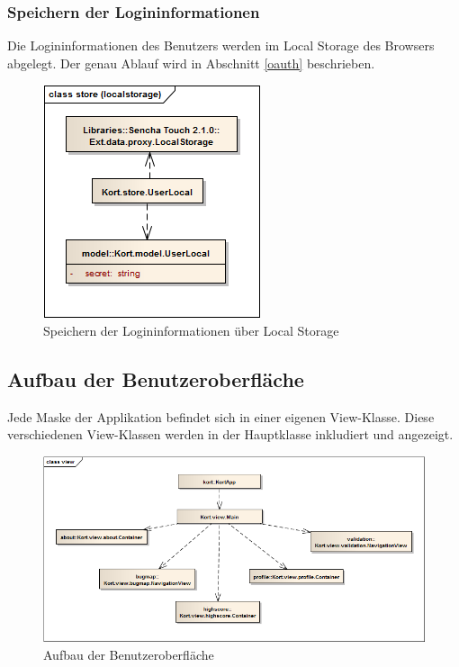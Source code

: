 \subsubsection{Speichern der Logininformationen}
Die Logininformationen des Benutzers werden im \gls{Local Storage} des Browsers abgelegt.
Der genau Ablauf wird in Abschnitt \ref{oauth} beschrieben.

\begin{figure}[H]
	\centering
	\includegraphics[scale=0.6]{images/uml/kort-classdiagram-store_localstorage}
	\caption{Speichern der Logininformationen über Local Storage}
	\label{image-kort-classdiagram-store_localstorage}
\end{figure}

\subsection{Aufbau der Benutzeroberfläche}
Jede Maske der Applikation befindet sich in einer eigenen View-Klasse.
Diese verschiedenen View-Klassen werden in der Hauptklasse  inkludiert und angezeigt.

\begin{figure}[H]
	\centering
	\includegraphics[width=\textwidth]{images/uml/kort-classdiagram-view}
	\caption{Aufbau der Benutzeroberfläche}
	\label{image-kort-classdiagram-view}
\end{figure}